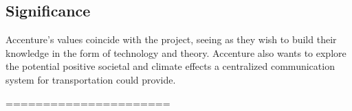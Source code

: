 \subsection{Significance}
Accenture's values coincide with the project, seeing as they wish to build their knowledge in the form of technology and theory. Accenture also wants to explore the potential positive societal and climate effects a centralized communication system for transportation could provide.

======================